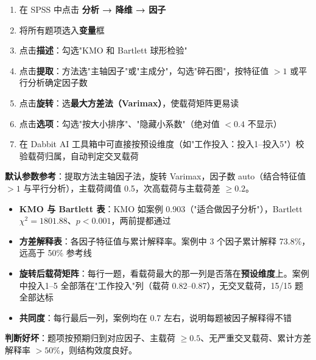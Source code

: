 \begin{algosposs}
\begin{enumerate}
    \item 在 SPSS 中点击 \textbf{分析 → 降维 → 因子}
    \item 将所有题项选入\textbf{变量}框
    \item 点击\textbf{描述}：勾选"KMO 和 Bartlett 球形检验"
    \item 点击\textbf{提取}：方法选"主轴因子"或"主成分"，勾选"碎石图"，按特征值 $>1$ 或平行分析确定因子数
    \item 点击\textbf{旋转}：选\textbf{最大方差法（Varimax）}，使载荷矩阵更易读
    \item 点击\textbf{选项}：勾选"按大小排序"、"隐藏小系数"（绝对值 $<0.4$ 不显示）
    \item 在 Dabbit AI 工具箱中可直接按预设维度（如"工作投入：投入1--投入5"）校验载荷归属，自动判定交叉载荷
\end{enumerate}

\textbf{默认参数参考}：提取方法主轴因子法，旋转 Varimax，因子数 auto（结合特征值 $>1$ 与平行分析），主载荷阈值 0.5，次高载荷与主载荷差 $\geq 0.2$。
\end{algosposs}

\begin{algoresult}
\begin{itemize}
    \item \textbf{KMO 与 Bartlett 表}：KMO 如案例 0.903（"适合做因子分析"），Bartlett $\chi^2=1801.88$、$p<0.001$，两前提都通过
    \item \textbf{方差解释表}：各因子特征值与累计解释率。案例中 3 个因子累计解释 73.8\%，远高于 50\% 参考线
    \item \textbf{旋转后载荷矩阵}：每行一题，看载荷最大的那一列是否落在\textbf{预设维度}上。案例中投入1--5 全部落在"工作投入"列（载荷 0.82--0.87），无交叉载荷，15/15 题全部达标
    \item \textbf{共同度}：每行最后一列，案例均在 0.7 左右，说明每题被因子解释得不错
\end{itemize}

\textbf{判断好坏}：题项按预期归到对应因子、主载荷 $\geq 0.5$、无严重交叉载荷、累计方差解释率 $>50\%$，则结构效度良好。
\end{algoresult}

